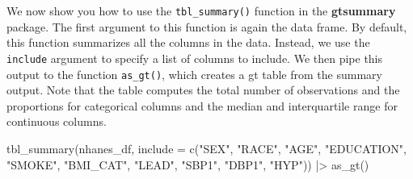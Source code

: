 \documentclass[
  letterpaper,
]{latex/krantz}
\makeatletter
\newenvironment{Shaded}{\begin{snugshade}}{\end{snugshade}}
\newcommand{\AttributeTok}[1]{\textcolor[rgb]{0.40,0.45,0.13}{#1}}
\newcommand{\FunctionTok}[1]{\textcolor[rgb]{0.28,0.35,0.67}{#1}}
\newcommand{\NormalTok}[1]{\textcolor[rgb]{0.00,0.23,0.31}{#1}}
\newcommand{\SpecialCharTok}[1]{\textcolor[rgb]{0.37,0.37,0.37}{#1}}
\newcommand{\StringTok}[1]{\textcolor[rgb]{0.13,0.47,0.30}{#1}}
\newenvironment{kframe}{%
\medskip{}
\setlength{\fboxsep}{.8em}
 \def\at@end@of@kframe{}%
 \ifinner\ifhmode%
  \def\at@end@of@kframe{\end{minipage}}%
  \begin{minipage}{\columnwidth}%
 \fi\fi%
 \def\FrameCommand##1{\hskip\@totalleftmargin \hskip-\fboxsep
 \colorbox{shadecolor}{##1}\hskip-\fboxsep
     \hskip-\linewidth \hskip-\@totalleftmargin \hskip\columnwidth}%
 \MakeFramed {\advance\hsize-\width
   \@totalleftmargin\z@ \linewidth\hsize
   \@setminipage}}%
 {\par\unskip\endMakeFramed%
 \at@end@of@kframe}
\renewenvironment{Shaded}{\begin{kframe}}{\end{kframe}}
\makeatother
\begin{document}
We now show you how to use the
\texttt{tbl\_summary()}
function in the \textbf{gtsummary} package.
The first argument to this function is again the data frame. By default,
this function summarizes all the columns in the data. Instead, we use
the \texttt{include} argument to specify a list of columns to include.
We then pipe this output to the function
\texttt{as\_gt()},
which creates a gt table from the summary output. Note that the table
computes the total number of observations and the proportions for
categorical columns and the median and interquartile range for
continuous columns.

\begin{Shaded}
\begin{Highlighting}[]
\FunctionTok{tbl\_summary}\NormalTok{(nhanes\_df, }
            \AttributeTok{include =} \FunctionTok{c}\NormalTok{(}\StringTok{"SEX"}\NormalTok{, }\StringTok{"RACE"}\NormalTok{, }\StringTok{"AGE"}\NormalTok{, }\StringTok{"EDUCATION"}\NormalTok{, }\StringTok{"SMOKE"}\NormalTok{, }
                        \StringTok{"BMI\_CAT"}\NormalTok{, }\StringTok{"LEAD"}\NormalTok{, }\StringTok{"SBP1"}\NormalTok{, }\StringTok{"DBP1"}\NormalTok{, }\StringTok{"HYP"}\NormalTok{)) }\SpecialCharTok{|\textgreater{}}
  \FunctionTok{as\_gt}\NormalTok{()}
\end{Highlighting}
\end{Shaded}
\end{document}
